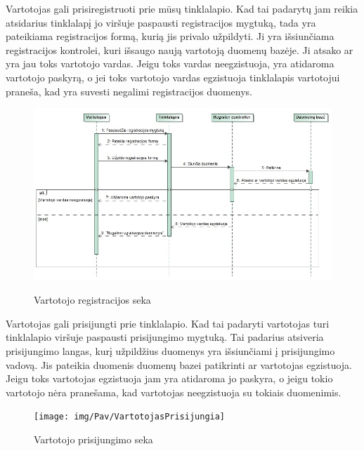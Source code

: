 ﻿\documentclass{VUMIFPSkursinis}
\begin{document}
Vartotojas gali prisiregistruoti prie mūsų tinklalapio. Kad tai padarytų jam reikia atsidarius tinklalapį jo viršuje paspausti registracijos mygtuką, tada yra pateikiama registracijos formą, kurią jis privalo užpildyti. Ji yra išsiunčiama registracijos kontrolei, kuri išsaugo naują vartotoją duomenų bazėje. Ji atsako ar yra jau toks vartotojo vardas.  Jeigu toks vardas neegzistuoja, yra atidaroma vartotojo paskyrą, o jei toks vartotojo vardas egzistuoja tinklalapis vartotojui praneša, kad yra suvesti negalimi registracijos duomenys.

\begin{figure}[H]
    \centering
    \includegraphics[scale=0.45]{img/Pav/VartotojoRegistracija}
    \label{img:uml2}
	\caption{Vartotojo registracijos seka}
\end{figure}

Vartotojas gali prisijungti prie tinklalapio. Kad tai padaryti vartotojas turi tinklalapio viršuje paspausti prisijungimo mygtuką. Tai padarius atsiveria prisijungimo langas, kurį užpildžius duomenys yra išsiunčiami į prisijungimo vadovą. Jis pateikia duomenis duomenų bazei patikrinti ar vartotojas egzistuoja. Jeigu toks vartotojas egzistuoja jam yra atidaroma jo paskyra, o jeigu tokio vartotojo nėra pranešama, kad vartotojas neegzistuoja su tokiais duomenimis.

\begin{figure}[H]
    \centering
    \texttt{[image: img/Pav/VartotojasPrisijungia]}
    \label{img:uml3}
	\caption{Vartotojo prisijungimo seka}
\end{figure}
\end{document}
